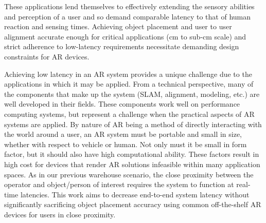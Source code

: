 \documentclass{vgtc}                          %
\begin{document}
These applications lend themselves to effectively extending the sensory abilities
and perception of a user and so demand comparable latency to that of human reaction and sensing times. 
Achieving object placement and user to user alignment accurate enough for critical applications (cm to sub-cm scale) %
and strict adherence to low-latency requirements necessitate demanding design constraints for AR devices. 



Achieving low latency in an AR system provides a unique challenge due to the applications in which it may be applied.
From a technical perspective, many of the components that make up the system (SLAM, alignment, modeling, etc.) are 
well developed in their fields. These components work well on performance computing systems, but represent a 
challenge when the practical aspects of AR systems are applied.
By nature of AR being a method of directly interacting with the 
world around a user, an AR system must be portable and small in size, whether with respect to vehicle or human. Not only must 
it be small in form factor, but it should also have high computational ability. These factors result in 
high cost for devices that render AR solutions infeasible within many application spaces. As in our previous warehouse scenario, the close 
proximity between the operator and object/person of interest requires the system to function at real-time latencies. This work
aims to decrease end-to-end system latency without significantly sacrificing object placement accuracy using common off-the-shelf AR devices for users in close proximity. 

\end{document}
